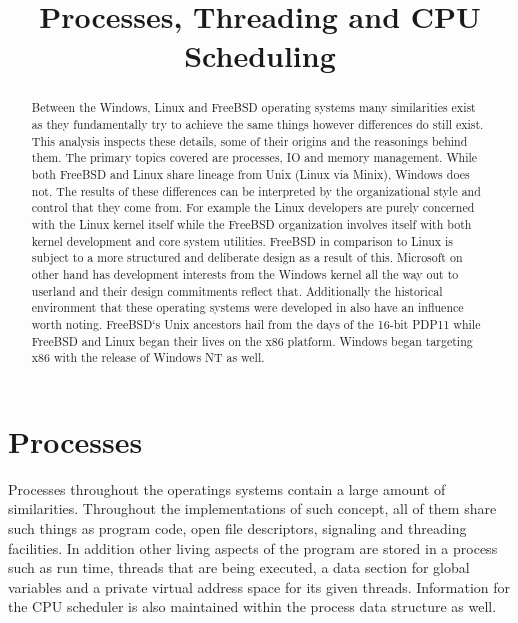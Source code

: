 \documentclass[letterpaper,10pt,draftclsnofoot,onecolumn]{IEEEtran}
\begin{document}
\title{Processes, Threading and CPU Scheduling}

\author{
}

\maketitle
\begin{abstract}
Between the Windows, Linux and FreeBSD operating systems many similarities exist as they fundamentally try to achieve the same things however differences do still exist. This analysis inspects these details, some of their origins and the reasonings behind them. The primary topics covered are processes, IO and memory management. While both FreeBSD and Linux share lineage from Unix (Linux via Minix), Windows does not. The results of these differences can be interpreted by the organizational style and control that they come from. For example the Linux developers are purely concerned with the Linux kernel itself while the FreeBSD organization involves itself with both kernel development and core system utilities. FreeBSD in comparison to Linux is subject to a more structured and deliberate design as a result of this. Microsoft on other hand has development interests from the Windows kernel all the way out to userland and their design commitments reflect that. Additionally the historical environment that these operating systems were developed in also have an influence worth noting. FreeBSD`s Unix ancestors hail from the days of the 16-bit PDP11 while FreeBSD and Linux began their lives on the x86 platform. Windows began targeting x86 with the release of Windows NT as well.
\end{abstract}
\pagebreak

\tableofcontents
\pagebreak
\section{Processes}
Processes throughout the operatings systems contain a large amount of similarities. Throughout the implementations of such concept, all of them share such things as program code, open file descriptors, signaling and threading facilities. In addition other living aspects of the program are stored in a process such as run time, threads that are being executed, a data section for global variables and a private virtual address space for its given threads. Information for the CPU scheduler is also maintained within the process data structure as well.\\
\end{document}
